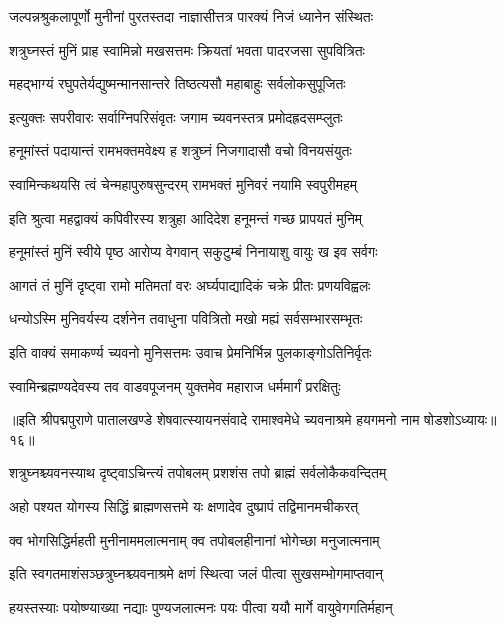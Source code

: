 \twolineshloka
{जल्पन्नश्रुकलापूर्णो मुनीनां पुरतस्तदा}
{नाज्ञासीत्तत्र पारक्यं निजं ध्यानेन संस्थितः}%

\twolineshloka
{शत्रुघ्नस्तं मुनिं प्राह स्वामिन्नो मखसत्तमः}
{क्रियतां भवता पादरजसा सुपवित्रितः}%

\twolineshloka
{महद्भाग्यं रघुपतेर्यद्युष्मन्मानसान्तरे}
{तिष्ठत्यसौ महाबाहुः सर्वलोकसुपूजितः}%

\twolineshloka
{इत्युक्तः सपरीवारः सर्वाग्निपरिसंवृतः}
{जगाम च्यवनस्तत्र प्रमोदह्रदसम्प्लुतः}%

\twolineshloka
{हनूमांस्तं पदायान्तं रामभक्तमवेक्ष्य ह}
{शत्रुघ्नं निजगादासौ वचो विनयसंयुतः}%

\twolineshloka
{स्वामिन्कथयसि त्वं चेन्महापुरुषसुन्दरम्}
{रामभक्तं मुनिवरं नयामि स्वपुरीमहम्}%

\twolineshloka
{इति श्रुत्वा महद्वाक्यं कपिवीरस्य शत्रुहा}
{आदिदेश हनूमन्तं गच्छ प्रापयतं मुनिम्}%

\twolineshloka
{हनूमांस्तं मुनिं स्वीये पृष्ठ आरोप्य वेगवान्}
{सकुटुम्बं निनायाशु वायुः ख इव सर्वगः}%

\twolineshloka
{आगतं तं मुनिं दृष्ट्वा रामो मतिमतां वरः}
{अर्घ्यपाद्यादिकं चक्रे प्रीतः प्रणयविह्वलः}%

\twolineshloka
{धन्योऽस्मि मुनिवर्यस्य दर्शनेन तवाधुना}
{पवित्रितो मखो मह्यं सर्वसम्भारसम्भृतः}%

\twolineshloka
{इति वाक्यं समाकर्ण्य च्यवनो मुनिसत्तमः}
{उवाच प्रेमनिर्भिन्न पुलकाङ्गोऽतिनिर्वृतः}%

\twolineshloka
{स्वामिन्ब्रह्मण्यदेवस्य तव वाडवपूजनम्}
{युक्तमेव महाराज धर्ममार्गं प्ररक्षितुः}%

{॥इति श्रीपद्मपुराणे पातालखण्डे शेषवात्स्यायनसंवादे रामाश्वमेधे च्यवनाश्रमे हयगमनो नाम षोडशोऽध्यायः॥१६॥}



\twolineshloka
{शत्रुघ्नश्च्यवनस्याथ दृष्ट्वाऽचिन्त्यं तपोबलम्}
{प्रशशंस तपो ब्राह्मं सर्वलोकैकवन्दितम्}%

\twolineshloka
{अहो पश्यत योगस्य सिद्धिं ब्राह्मणसत्तमे}
{यः क्षणादेव दुष्प्रापं तद्विमानमचीकरत्}%

\twolineshloka
{क्व भोगसिद्धिर्महती मुनीनाममलात्मनाम्}
{क्व तपोबलहीनानां भोगेच्छा मनुजात्मनाम्}%

\twolineshloka
{इति स्वगतमाशंसञ्छत्रुघ्नश्च्यवनाश्रमे}
{क्षणं स्थित्वा जलं पीत्वा सुखसम्भोगमाप्तवान्}%

\twolineshloka
{हयस्तस्याः पयोष्ण्याख्या नद्याः पुण्यजलात्मनः}
{पयः पीत्वा ययौ मार्गे वायुवेगगतिर्महान्}%

